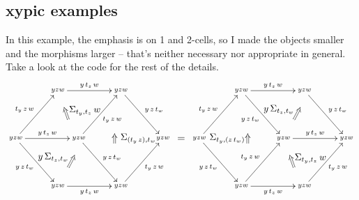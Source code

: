 \documentclass[11pt,oneside,draft]{amsart}
\begin{document}
\subsection{xypic examples}

In this example, the emphasis is on 1 and 2-cells, so I made the
objects smaller and the morphisms larger -- that's neither necessary
nor appropriate in general.  Take a look at the code for the rest of
the details.
\[
  \def\objectstyle{\scriptstyle}
  \def\labelstyle{\textstyle}
  \begin{xy}
    0;<.79mm,0mm>:<0mm,.9mm>:: %
    (0,0)*+{yzw}="LL";
    (20,20)*+{yzw}="TL";
    (20,-20)*+{yzw}="BL";
    (50,20)*+{yzw}="TR";
    (50,-20)*+{yzw}="BR";
    (70,0)*+{yzw}="RR";
    (30,0)*+{yzw}="CC";  
    {\ar^-{\scriptstyle t_y \, z \, w} "LL"; "TL"};
    {\ar^-{\scriptstyle y \, t_z \, w} "TL"; "TR"};
    {\ar^-{\scriptstyle y \, z \, t_w} "TR"; "RR"};
    {\ar_-{\scriptstyle y \, z \, t_w} "LL"; "BL"};
    {\ar_-{\scriptstyle y \, t_z \, w} "BL"; "BR"};
    {\ar_-{\scriptstyle t_y \, z \, w} "BR"; "RR"};
    {\ar^-{\scriptstyle y \, t_z \, w} "LL"; "CC"};
    {\ar_-{\scriptstyle t_y \, z \, w} "CC"; "TR"};
    {\ar^-{\scriptstyle y \, z \, t_w} "CC"; "BR"};
    {\ar@{=>}_-{\Sigma_{t_y,t_z} \, w} "CC"+(-5,8); "TL"+(3,-7) };
    {\ar@{=>}^-{y \, \Sigma_{t_z,t_w}} "BL"+(5,8); "CC"+(-2,-7) };
    {\ar@{=>}_-{\ \Sigma_{(t_y \, z), t_w}} "BR"+(-3,18); "TR"+(-3,-18) };
  \end{xy}
  \begin{xy}
    0;<2.2mm,0mm>:<0mm,2.2mm>:: %
    {\ar@{=}^{} (1,0)*+{}; (-1,0)*+{};};
  \end{xy}
  \begin{xy}
    0;<.79mm,0mm>:<0mm,.9mm>:: %
    (0,0)*+{yzw}="LL";
    (20,20)*+{yzw}="TL";
    (20,-20)*+{yzw}="BL";
    (50,20)*+{yzw}="TR";
    (50,-20)*+{yzw}="BR";
    (70,0)*+{yzw}="RR";
    (40,0)*+{yzw}="CC";  
    {\ar^-{\scriptstyle t_y \, z \, w} "LL"; "TL"};
    {\ar^-{\scriptstyle y \, t_z \, w} "TL"; "TR"};
    {\ar^-{\scriptstyle y \, z \, t_w} "TR"; "RR"};
    {\ar_-{\scriptstyle y \, z \, t_w} "LL"; "BL"};
    {\ar_-{\scriptstyle y \, t_z \, w} "BL"; "BR"};
    {\ar_-{\scriptstyle t_y \, z \, w} "BR"; "RR"};
    {\ar_-{\scriptstyle y \, z \, t_w} "TL"; "CC"};
    {\ar^-{\scriptstyle t_y \, z \, w} "BL"; "CC"};
    {\ar^-{\scriptstyle y \, t_z \, w} "CC"; "RR"};
    {\ar@{=>}^-{\Sigma_{t_y, (z \, t_w)}} "BL"+(3,18); "TL"+(3,-18) };
    {\ar@{=>}_-{\Sigma_{t_y,t_z} \, w} "BR"+(-5,8); "CC"+(3,-7) };
    {\ar@{=>}^-{y \, \Sigma_{t_z,t_w}} "CC"+(5,8); "TR"+(-2,-7) };
  \end{xy}
\]
\end{document}
